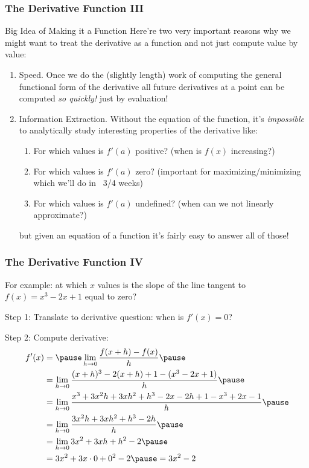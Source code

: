 \documentclass{ltx-talk}
\begin{document}
\begin{frame}
  \frametitle{The Derivative Function III}

  \begin{alertblock}{Big Idea of Making it a Function}
    Here're two very important reasons why we might want to treat the derivative as a function and not just compute value by value: \pause
    \begin{enumerate}
      \item Speed. \pause Once we do the (slightly length) work of
        computing the general functional form of the derivative \pause
        all future derivatives at a point can be computed \textit{so quickly!} just by evaluation! \pause
      \item Information Extraction. \pause Without the equation of the function, it's \textit{impossible} to analytically study interesting properties of the derivative like: \pause
        \begin{enumerate}
          \item For which values is $f'(a)$ positive? (when is $f(x)$ increasing?) \pause
          \item For which values is $f'(a)$ zero? (important for maximizing/minimizing which we'll do in ~3/4 weeks) \pause
          \item For which values is $f'(a)$ undefined? (when can we not linearly approximate?) \pause
        \end{enumerate}
        but given an equation of a function it's fairly easy to answer all of those!
    \end{enumerate}
  \end{alertblock}
\end{frame}

\begin{frame}
  \frametitle{The Derivative Function IV}
  For example: at which $x$ values is the slope of the line tangent to $f(x) = x^3 - 2x + 1$ equal to zero? \pause

  Step 1: Translate to derivative question: \pause when is $f'(x) = 0$? \pause

  Step 2: Compute derivative: \pause
  \begin{align}
    f'(x) &= \pause \lim\limits_{h \rightarrow 0} \dfrac{f(x + h) - f(x)}{h} \pause \\
          &= \lim\limits_{h \rightarrow 0} \dfrac{(x + h)^3 - 2(x + h) + 1 - (x^3 - 2x + 1)}{h} \pause \\
          &= \lim\limits_{h \rightarrow 0} \dfrac{x^3 + 3x^2 h + 3xh^2 + h^3 - 2x - 2h + 1 - x^3 + 2x - 1}{h} \pause \\
          &= \lim\limits_{h \rightarrow 0} \dfrac{3x^2 h + 3xh^2 + h^3 - 2h}{h} \pause \\
          &= \lim\limits_{h \rightarrow 0} 3x^2 + 3xh + h^2 - 2 \pause \\
          &= 3x^2 + 3x \cdot 0 + 0^2 - 2 \pause = 3x^2 - 2
  \end{align}
\end{frame}
\end{document}
